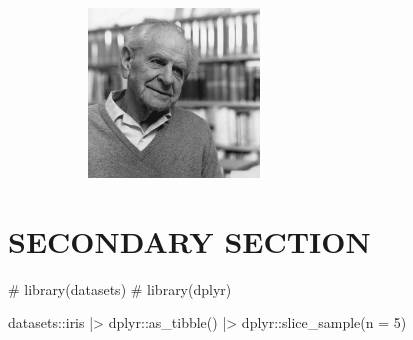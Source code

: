 \documentclass[
  12pt,
  a4paper,
  oneside]{tesesusp}
\newenvironment{Shaded}{\begin{snugshade}}{\end{snugshade}}
\newcommand{\AttributeTok}[1]{\textcolor[rgb]{0.40,0.45,0.13}{#1}}
\newcommand{\CommentTok}[1]{\textcolor[rgb]{0.37,0.37,0.37}{#1}}
\newcommand{\DecValTok}[1]{\textcolor[rgb]{0.68,0.00,0.00}{#1}}
\newcommand{\FunctionTok}[1]{\textcolor[rgb]{0.28,0.35,0.67}{#1}}
\newcommand{\NormalTok}[1]{\textcolor[rgb]{0.00,0.23,0.31}{#1}}
\newcommand{\SpecialCharTok}[1]{\textcolor[rgb]{0.37,0.37,0.37}{#1}}
\begin{document}
\begin{figure}

\caption{\label{fig-karl-popper}Karl Popper (July 25, 1902 -- September
17, 1994).\\
One of the 20th century's most influential philosophers of science.}

{\centering 

\begin{figure}[H]

{\centering \includegraphics[width=0.5\textwidth,height=\textheight]{images/karl-popper.png}

}

\end{figure}

}

\end{figure}

\hypertarget{secondary-section}{%
\section{SECONDARY SECTION}\label{secondary-section}}

\begin{Shaded}
\begin{Highlighting}[numbers=left,,]
\CommentTok{\# library(datasets)}
\CommentTok{\# library(dplyr)}

\NormalTok{datasets}\SpecialCharTok{::}\NormalTok{iris }\SpecialCharTok{|\textgreater{}}
\NormalTok{  dplyr}\SpecialCharTok{::}\FunctionTok{as\_tibble}\NormalTok{() }\SpecialCharTok{|\textgreater{}}
\NormalTok{  dplyr}\SpecialCharTok{::}\FunctionTok{slice\_sample}\NormalTok{(}\AttributeTok{n =} \DecValTok{5}\NormalTok{)}
\end{Highlighting}
\end{Shaded}
\end{document}
